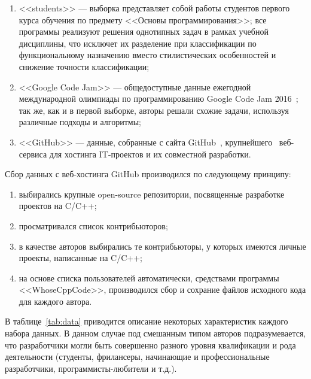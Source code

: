 \begin{enumerate}
 \item <<students>> --- выборка представляет собой работы студентов первого курса обучения по 
 предмету <<Основы программирования>>; все программы реализуют решения однотипных задач в рамках учебной 
 дисциплины, что исключет их разделение при классификации по функциональному назначению вместо 
 стилистических особенностей и снижение точности классификации; 
 \item <<Google Code Jam>> --- общедоступные данные ежегодной международной олимпиады по программированию Google Code Jam 
 2016~\cite{GoogleCodeJam}; так же, как и в первой выборке, авторы решали схожие задачи, используя различные
 подходы и алгоритмы; 
\item <<GitHub>> --- данные, собранные с сайта GitHub~\cite{GitHub}, крупнейшего~\cite{GH_domain} 
веб-сервиса для хостинга IT-проектов и их совместной разработки. 
\end{enumerate}


Сбор данных с веб-хостинга GitHub производился по следующему принципу: 
\begin{enumerate}
 \item выбирались крупные open-source репозитории,  
 посвященные разработке проектов на C/C++;
 \item просматривался список контрибьюторов;
 \item в качестве авторов выбирались те контрибьюторы, у которых имеются личные проекты, написанные 
 на C/C++;
 \item на основе списка пользователей автоматически, средствами программы <<WhoseCppCode>>, производился
 сбор и сохрание файлов исходного кода для каждого автора. 
\end{enumerate}

В таблице~\ref{tab:data} приводится описание некоторых характеристик каждого набора данных.
В данном случае под смешанным типом авторов подразумевается, что разработчики могли быть совершенно
разного уровня квалификации и рода деятельности (студенты, фрилансеры, начинающие и 
профессиональные разработчики, программисты-любители и т.д.).

